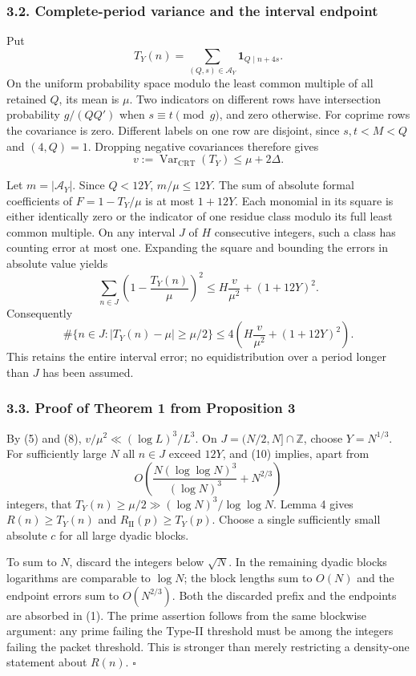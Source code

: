 \documentclass[
  english,
  11pt,
]{article}
\begin{document}
\subsubsection{3.2. Complete-period variance and the interval
endpoint}\label{complete-period-variance-and-the-interval-endpoint}

Put \[
T_Y(n)=\sum_{(Q,s)\in\mathcal A_Y}\mathbf1_{Q\mid n+4s}.
\] On the uniform probability space modulo the least common multiple of
all retained \(Q\), its mean is \(\mu\). Two indicators on different
rows have intersection probability \(g/(QQ')\) when
\(s\equiv t\pmod g\), and zero otherwise. For coprime rows the
covariance is zero. Different labels on one row are disjoint, since
\(s,t<M<Q\) and \((4,Q)=1\). Dropping negative covariances therefore
gives \[
v:=\operatorname{Var}_{\mathrm{CRT}}(T_Y)\le\mu+2\Delta. \tag{8}
\]

Let \(m=|\mathcal A_Y|\). Since \(Q<12Y\), \(m/\mu\le12Y\). The sum of
absolute formal coefficients of \(F=1-T_Y/\mu\) is at most \(1+12Y\).
Each monomial in its square is either identically zero or the indicator
of one residue class modulo its full least common multiple. On any
interval \(J\) of \(H\) consecutive integers, such a class has counting
error at most one. Expanding the square and bounding the errors in
absolute value yields \[
\sum_{n\in J}\left(1-\frac{T_Y(n)}{\mu}\right)^2
\le H\frac{v}{\mu^2}+(1+12Y)^2. \tag{9}
\] Consequently \[
\#\{n\in J:|T_Y(n)-\mu|\ge\mu/2\}
\le4\left(H\frac{v}{\mu^2}+(1+12Y)^2\right). \tag{10}
\] This retains the entire interval error; no equidistribution over a
period longer than \(J\) has been assumed.

\subsubsection{3.3. Proof of Theorem 1 from Proposition
3}\label{proof-of-theorem-1-from-proposition-3}

By (5) and (8), \(v/\mu^2\ll(\log L)^3/L^3\). On
\(J=(N/2,N]\cap\mathbb Z\), choose \(Y=N^{1/3}\). For sufficiently large
\(N\) all \(n\in J\) exceed \(12Y\), and (10) implies, apart from \[
O\left(\frac{N(\log\log N)^3}{(\log N)^3}+N^{2/3}\right)
\] integers, that \(T_Y(n)\ge\mu/2\gg(\log N)^3/\log\log N\). Lemma 4
gives \(R(n)\ge T_Y(n)\) and \(R_{\mathrm{II}}(p)\ge T_Y(p)\). Choose a
single sufficiently small absolute \(c\) for all large dyadic blocks.

To sum to \(N\), discard the integers below \(\sqrt N\). In the
remaining dyadic blocks logarithms are comparable to \(\log N\); the
block lengths sum to \(O(N)\) and the endpoint errors sum to
\(O(N^{2/3})\). Both the discarded prefix and the endpoints are absorbed
in (1). The prime assertion follows from the same blockwise argument:
any prime failing the Type-II threshold must be among the integers
failing the packet threshold. This is stronger than merely restricting a
density-one statement about \(R(n)\). \(\square\)
\end{document}
